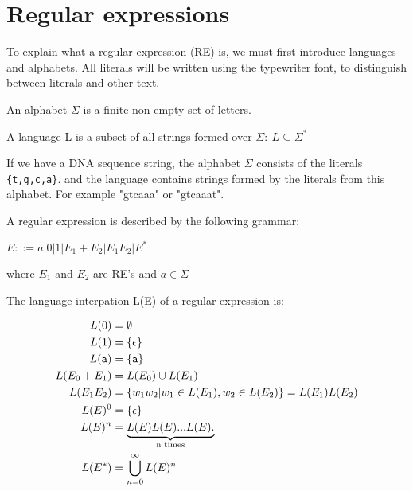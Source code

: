 \section{Regular expressions} 
  To explain what a regular expression (RE)  is, we must first introduce languages and alphabets. All literals will be written using the typewriter font, to distinguish between literals and other text. 
\begin{mydef}\label{alph}
An alphabet $\Sigma$ is a finite non-empty set of letters.
\end{mydef}

\begin{mydef}\label{lang}
A language L is a subset of all strings formed over $\Sigma:~ L\subseteq \Sigma^*$
\end{mydef}

\begin{myex}\label{reex}
If we have a DNA sequence string, the alphabet $\Sigma$ consists of the literals {\tt\{t,g,c,a\}}. and the language contains strings formed by the literals from this alphabet. For example "gtcaaa" or "gtcaaat". 
\end{myex}


\begin{mydef}
A regular expression is described by the following grammar: \\
\begin{center}
$E::= a|0|1|E_1 + E_2 |E_1 E_2 | E^*$
\end{center}
where $E_1$ and $E_2$ are RE's and $a \in \Sigma$
\end{mydef}

\begin{mydef}\label{re}
The language interpation L(E) of a regular expression is: 
\begin{center}
\begin{align*}
L(0)           &= \emptyset\\
L(1)         &= \{\epsilon\} \\
L({\tt a})     &= \{{\tt a}\} \\
L(E_0 + E_1) &= L(E_0) \cup L(E_1) \\
L(E_1 E_2)   &= \{w_1w_2 | w_1 \in L(E_1),w_2 \in L(E_2)\}=L(E_1)L(E_2) \\
L(E)^0       &= \{\epsilon\}\\
L(E)^n       &= \underbrace{L(E)L(E)...L(E).}_\text{n times}\\
L(E^*)       &= \bigcup\limits_{n=0}^\infty L(E)^n 
\end{align*}
\end{center}
\cite[p.5 def. 3]{crash}
\end{mydef}

